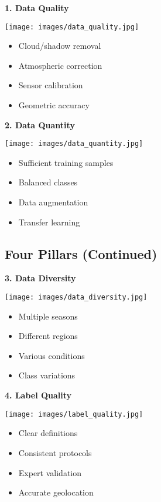 \documentclass[
  letterpaper,
  DIV=11,
  numbers=noendperiod]{scrartcl}
\providecommand{\tightlist}{%
  \setlength{\itemsep}{0pt}\setlength{\parskip}{0pt}}
\begin{document}
\textbf{1. Data Quality}

\texttt{[image: images/data\_quality.jpg]}

\begin{itemize}
\tightlist
\item
  Cloud/shadow removal
\item
  Atmospheric correction
\item
  Sensor calibration
\item
  Geometric accuracy
\end{itemize}

\textbf{2. Data Quantity}

\texttt{[image: images/data\_quantity.jpg]}

\begin{itemize}
\tightlist
\item
  Sufficient training samples
\item
  Balanced classes
\item
  Data augmentation
\item
  Transfer learning
\end{itemize}

\subsection{Four Pillars (Continued)}\label{four-pillars-continued}

\textbf{3. Data Diversity}

\texttt{[image: images/data\_diversity.jpg]}

\begin{itemize}
\tightlist
\item
  Multiple seasons
\item
  Different regions
\item
  Various conditions
\item
  Class variations
\end{itemize}

\textbf{4. Label Quality}

\texttt{[image: images/label\_quality.jpg]}

\begin{itemize}
\tightlist
\item
  Clear definitions
\item
  Consistent protocols
\item
  Expert validation
\item
  Accurate geolocation
\end{itemize}
\end{document}
